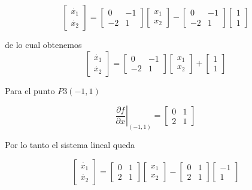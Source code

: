 \documentclass[12pt]{book}
\theoremstyle{definition}
\theoremstyle{remark}
\theoremstyle{plain}
\begin{document}
\begin{equation*}
 \begin{bmatrix}
\dot{x_1}\\
\dot{x_2}
\end{bmatrix}=
\begin{bmatrix}
0 & -1\\
-2 & 1
\end{bmatrix}
 \begin{bmatrix}
x_1\\
x_2
\end{bmatrix}
-
\begin{bmatrix}
0 & -1\\
-2 & 1
\end{bmatrix}
 \begin{bmatrix}
1\\
1
\end{bmatrix}
\end{equation*}

de lo cual obtenemos
\begin{equation*}
 \begin{bmatrix}
\dot{x_1}\\
\dot{x_2}
\end{bmatrix}=
\begin{bmatrix}
0 & -1\\
-2 & 1
\end{bmatrix}
 \begin{bmatrix}
x_1\\
x_2
\end{bmatrix}
+
 \begin{bmatrix}
1\\
1
\end{bmatrix}
\end{equation*}

Para el punto $P3(-1,1)$ 

\begin{equation}
\label{equ113}
 \left .  \frac{\partial f}{\partial x} \right |_{(-1,1)} =
\begin{bmatrix}
0 & 1\\
2 & 1
\end{bmatrix}
\end{equation}

Por lo tanto el sistema lineal queda

\begin{equation*}
 \begin{bmatrix}
\dot{x_1}\\
\dot{x_2}
\end{bmatrix}=
\begin{bmatrix}
0 & 1\\
2 & 1
\end{bmatrix}
 \begin{bmatrix}
x_1\\
x_2
\end{bmatrix}
-
\begin{bmatrix}
0 & 1\\
2 & 1
\end{bmatrix}
 \begin{bmatrix}
-1\\
1
\end{bmatrix}
\end{equation*}
\end{document}
